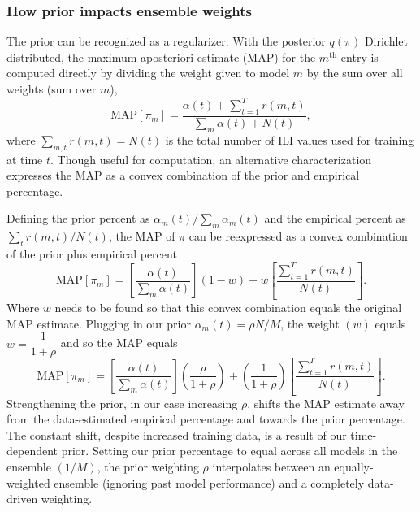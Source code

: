 \documentclass[12pt]{article}
\def\l{\left}
\def\r{\right}
\newcommand{\f}{\frac}
\begin{document}
\subsubsection{How prior impacts ensemble weights}
The prior can be recognized as a regularizer.
With the posterior $q(\pi)$ Dirichlet distributed, the maximum aposteriori estimate (MAP) for the $m^{\text{th}}$ entry is computed directly by dividing the weight given to model $m$ by the sum over all weights (sum over $m$),
\begin{equation*}
  \text{MAP}\l[\pi_m\r] = \f{ \alpha(t) + \sum_{t=1}^{T}r(m,t)}{ \sum_{m}\alpha(t) + N(t) },
\end{equation*}
where $\sum_{m,t}r(m,t)=N(t)$ is the total number of ILI values used for training at time $t$.
Though useful for computation, an alternative characterization expresses the MAP as a convex combination of the prior and empirical percentage.

Defining the prior percent as $\alpha_{m}(t)/\sum_{m}\alpha_{m}(t)$ and the empirical percent as $\sum_{t}r(m,t)/N(t)$, the MAP of $\pi$ can be reexpressed as a convex combination of the prior plus empirical percent
\begin{equation*}
  \text{MAP}\l[\pi_m\r] = \l[ \f{\alpha(t)}{\sum_{m} \alpha(t)}\r](1-w) + w \l[\f{\sum_{t=1}^{T}r(m,t)}{N(t)}\r].
\end{equation*}
Where $w$ needs to be found so that this convex combination equals the original MAP estimate.
Plugging in our prior $\alpha_{m}(t) = \rho N /M$, the weight $(w)$ equals $w = \dfrac{1}{1+\rho}$
and so the MAP equals 
\begin{equation}
  \text{MAP}\l[\pi_m\r] = \l[ \f{\alpha(t)}{\sum_{m} \alpha(t)}\r]\l(\f{\rho}{1+\rho}\r) + \l(\f{1}{1+\rho}\r) \l[\f{\sum_{t=1}^{T}r(m,t)}{N(t)}\r].
\end{equation}
Strengthening the prior, in our case increasing $\rho$, shifts the MAP estimate away from the data-estimated empirical percentage and towards the prior percentage.
The constant shift, despite increased training data, is a result of our time-dependent prior.
Setting our prior percentage to equal across all models in the ensemble $(1/M)$, the prior weighting $\rho$ interpolates between an equally-weighted ensemble (ignoring past model performance) and a completely data-driven weighting.
\end{document}
